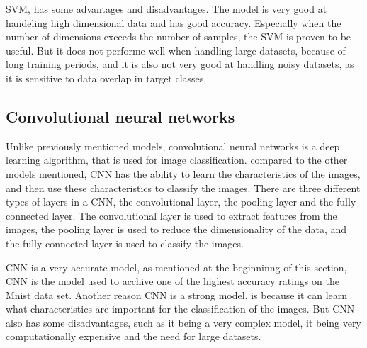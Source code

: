 SVM, has some advantages and disadvantages. The model is very good at handeling high dimensional data and has good accuracy. Especially when the number of dimensions exceeds the number of samples, the SVM is proven to be useful. 
But it does not performe well when handling large datasets, because of long training periods, and it is also not very good at handling noisy datasets, as it is sensitive to data overlap in target classes.


\subsection{Convolutional neural networks}
Unlike previously mentioned models, convolutional neural networks is a deep learning algorithm, that is used for image classification. compared to the other models mentioned, CNN has the ability to learn the characteristics of the images, and then use these characteristics to classify the images. There are three different types of layers in a CNN, the convolutional layer, the pooling layer and the fully connected layer. The convolutional layer is used to extract features from the images, the pooling layer is used to reduce the dimensionality of the data, and the fully connected layer is used to classify the images.

CNN is a very accurate model, as mentioned at the beginninng of this section, CNN is the model used to acchive one of the highest accuracy ratings on the Mnist data set. Another reason CNN is a strong model, is because it can learn what characteristics are important for the classification of the images. But CNN also has some disadvantages, such as it being a very complex model, it being very computationally expensive and the need for large datasets.




